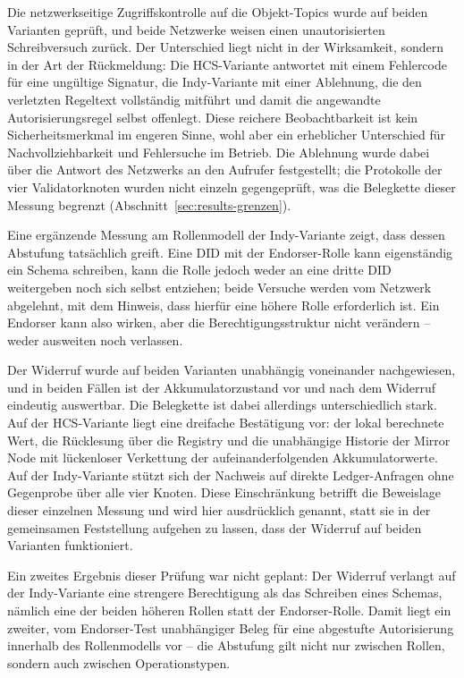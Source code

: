Die netzwerkseitige Zugriffskontrolle auf die Objekt-Topics wurde auf beiden Varianten geprüft, und beide Netzwerke weisen einen unautorisierten Schreibversuch zurück. Der Unterschied liegt nicht in der Wirksamkeit, sondern in der Art der Rückmeldung: Die HCS-Variante antwortet mit einem Fehlercode für eine ungültige Signatur, die Indy-Variante mit einer Ablehnung, die den verletzten Regeltext vollständig mitführt und damit die angewandte Autorisierungsregel selbst offenlegt. Diese reichere Beobachtbarkeit ist kein Sicherheitsmerkmal im engeren Sinne, wohl aber ein erheblicher Unterschied für Nachvollziehbarkeit und Fehlersuche im Betrieb. Die Ablehnung wurde dabei über die Antwort des Netzwerks an den Aufrufer festgestellt; die Protokolle der vier Validatorknoten wurden nicht einzeln gegengeprüft, was die Belegkette dieser Messung begrenzt (Abschnitt~\ref{sec:results-grenzen}).

Eine ergänzende Messung am Rollenmodell der Indy-Variante zeigt, dass dessen Abstufung tatsächlich greift. Eine DID mit der Endorser-Rolle kann eigenständig ein Schema schreiben, kann die Rolle jedoch weder an eine dritte DID weitergeben noch sich selbst entziehen; beide Versuche werden vom Netzwerk abgelehnt, mit dem Hinweis, dass hierfür eine höhere Rolle erforderlich ist. Ein Endorser kann also wirken, aber die Berechtigungsstruktur nicht verändern -- weder ausweiten noch verlassen.

Der Widerruf wurde auf beiden Varianten unabhängig voneinander nachgewiesen, und in beiden Fällen ist der Akkumulatorzustand vor und nach dem Widerruf eindeutig auswertbar. Die Belegkette ist dabei allerdings unterschiedlich stark. Auf der HCS-Variante liegt eine dreifache Bestätigung vor: der lokal berechnete Wert, die Rücklesung über die Registry und die unabhängige Historie der Mirror Node mit lückenloser Verkettung der aufeinanderfolgenden Akkumulatorwerte. Auf der Indy-Variante stützt sich der Nachweis auf direkte Ledger-Anfragen ohne Gegenprobe über alle vier Knoten. Diese Einschränkung betrifft die Beweislage dieser einzelnen Messung und wird hier ausdrücklich genannt, statt sie in der gemeinsamen Feststellung aufgehen zu lassen, dass der Widerruf auf beiden Varianten funktioniert.

Ein zweites Ergebnis dieser Prüfung war nicht geplant: Der Widerruf verlangt auf der Indy-Variante eine strengere Berechtigung als das Schreiben eines Schemas, nämlich eine der beiden höheren Rollen statt der Endorser-Rolle. Damit liegt ein zweiter, vom Endorser-Test unabhängiger Beleg für eine abgestufte Autorisierung innerhalb des Rollenmodells vor -- die Abstufung gilt nicht nur zwischen Rollen, sondern auch zwischen Operationstypen.

